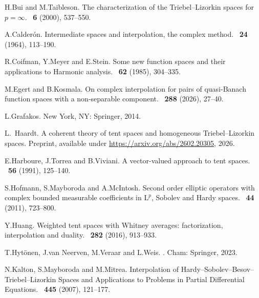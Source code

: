 \documentclass[11pt, leqno,parskip=half]{amsart}
\theoremstyle{definition}
\renewcommand{\L}{\mathrm{L}}
\numberwithin{equation}{section}
\begin{document}
\begin{bibdiv}
\begin{biblist}
H.\@ Bui and M.\@ Taibleson.
\newblock The characterization of the Triebel--Lizorkin spaces for $p=\infty$.
~\textbf{6} (2000), 537--550.

A.\@ Calderón.
\newblock Intermediate spaces and interpolation, the complex method.
~\textbf{24} (1964), 113--190.

R.\@ Coifman, Y.\@ Meyer and E.\@ Stein.
\newblock Some new function spaces and their applications to Harmonic analysis.
~\textbf{62} (1985), 304--335.

M.\@ Egert and B.\@ Kosmala.
\newblock On complex interpolation for pairs of quasi-Banach function spaces with a non-separable component.
~\textbf{288} (2026), 27--40.

L.\@ Grafakos.
\newblock New York, NY: Springer, 2014.

L.~Haardt.
\newblock A coherent theory of tent spaces and homogeneous Triebel--Lizorkin spaces.
\newblock Preprint, available under \url{https://arxiv.org/abs/2602.20305}, 2026.

E.\@ Harboure, J.\@ Torrea and B.\@ Viviani.
\newblock A vector-valued approach to tent spaces.
~\textbf{56} (1991), 125--140.

S.\@ Hofmann, S.\@ Mayboroda and A.\@ McIntosh.
\newblock Second order elliptic operators with complex bounded measurable coefficients in $\L^p$, {Sobolev} and {Hardy} spaces.
~\textbf{44} (2011), 723--800.

Y.\@ Huang.
\newblock Weighted tent spaces with Whitney averages:
factorization, interpolation and duality.
~\textbf{282} (2016), 913--933.

T.\@ Hytönen, J.\@ van Neerven, M.\@ Veraar and L.\@ Weis.
.
\newblock Cham: Springer, 2023.

N.\@ Kalton, S.\@ Mayboroda and M.\@ Mitrea.
\newblock Interpolation of Hardy--Sobolev--Besov--Triebel--Lizorkin Spaces and Applications to Problems in Partial Differential Equations.
~\textbf{445} (2007),  121--177.


\end{biblist}
\end{bibdiv}
\end{document}
